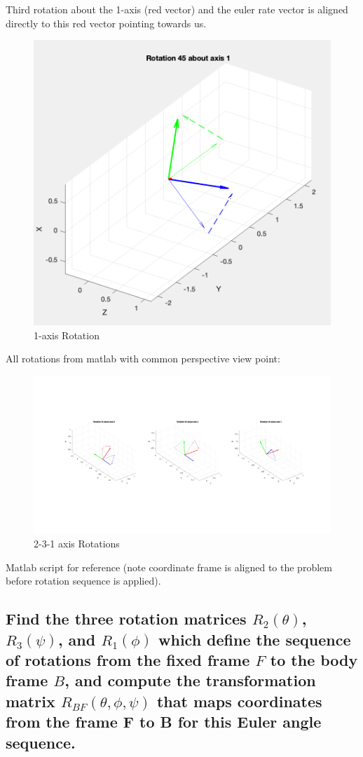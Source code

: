 \documentclass{article}
\begin{document}
Third rotation about the 1-axis (red vector) and the euler rate vector is aligned directly to this red vector pointing towards us.
\begin{figure}[H]
    \centering
    \includegraphics[width=0.8\linewidth]{1_axis_rotation.png}
    \caption{1-axis Rotation}
\end{figure}

All rotations from matlab with common perspective view point:
\begin{figure}[H]
    \centering
    \includegraphics[width=\linewidth]{2_3_1_rotations.jpg}
    \caption{2-3-1 axis Rotations}
\end{figure}

Matlab script for reference (note coordinate frame is aligned to the problem before rotation sequence is applied).


\subsection{Find the three rotation matrices $R_2(\theta)$, $R_3(\psi)$, and $R_1(\phi)$ which define the sequence of rotations from the fixed frame $F$ to the body frame $B$, and compute the transformation matrix $R_{BF}(\theta, \phi, \psi)$ that maps coordinates from the frame F to B for this Euler angle sequence.}
\end{document}
